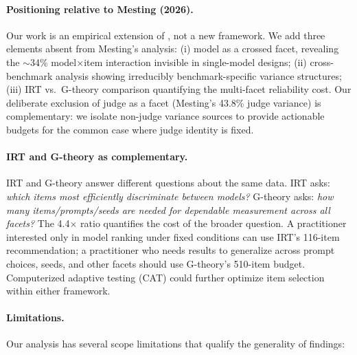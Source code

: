 \documentclass[11pt]{article}
\begin{document}
\paragraph{Positioning relative to Mesting (2026).}
Our work is an empirical extension of \citet{mesting2026}, not a new framework.
We add three elements absent from Mesting's analysis: (i) model as a crossed facet, revealing the $\sim$34\% model$\times$item interaction invisible in single-model designs; (ii) cross-benchmark analysis showing irreducibly benchmark-specific variance structures; (iii) IRT vs.\ G-theory comparison quantifying the multi-facet reliability cost.
Our deliberate exclusion of judge as a facet (Mesting's 43.8\% judge variance) is complementary: we isolate non-judge variance sources to provide actionable budgets for the common case where judge identity is fixed.

\paragraph{IRT and G-theory as complementary.}
IRT and G-theory answer different questions about the same data.
IRT asks: \emph{which items most efficiently discriminate between models?}
G-theory asks: \emph{how many items/prompts/seeds are needed for dependable measurement across all facets?}
The 4.4$\times$ ratio quantifies the cost of the broader question.
A practitioner interested only in model ranking under fixed conditions can use IRT's 116-item recommendation; a practitioner who needs results to generalize across prompt choices, seeds, and other facets should use G-theory's 510-item budget.
Computerized adaptive testing (CAT) \citep{polo2024} could further optimize item selection within either framework.

\paragraph{Limitations.}
Our analysis has several scope limitations that qualify the generality of findings:
\end{document}
